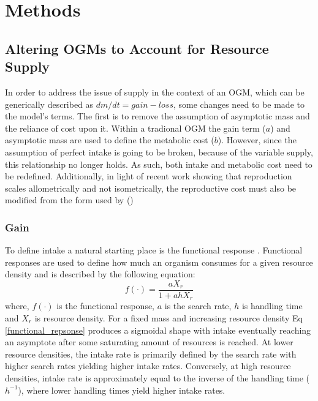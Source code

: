 \documentclass[a4paper, 11pt, hidelinks]{article} %
\begin{document}
% 
	\nolinenumbers
	
\section{Methods}
	\linenumbers
	
	\subsection{Altering OGMs to Account for Resource Supply}
	In order to address the issue of supply in the context of an OGM, which can be generically described as $dm/dt = gain - loss$, some changes need to be made to the model's terms.  The first is to remove the assumption of asymptotic mass and the reliance of cost upon it.  Within a tradional OGM the gain term ($ a $) and asymptotic mass are used to define the metabolic cost ($ b $).  However, since the assumption of perfect intake is going to be broken, because of the variable supply, this relationship no longer holds.  As such, both intake and metabolic cost need to be redefined.  Additionally, in light of recent work showing that reproduction scales allometrically and not isometrically, the reproductive cost must also be modified from the form used by \citeauthor{Charnov2001} (\citeyear{Charnov2001}) \parencite{Marshall2019, Barneche2018} %
	
	
	\subsubsection{Gain}
	To define intake a natural starting place is the functional response \parencite{Holling1959}.  Functional responses  are used to define how much an organism consumes for a given resource density and is described by the following equation:	
	\begin{equation}
		\label{functional_repsonse}
		f(\cdot) = \frac{a X_r}{1 + a h X_r}
	\end{equation}
	where, $ f(\cdot) $ is the functional response, $ a $ is the search rate, $ h $ is handling time and $ X_r $ is resource density.  
	For a fixed mass and increasing resource density Eq \ref{functional_repsonse} produces a sigmoidal shape with intake eventually reaching an asymptote after some saturating amount of resources is reached.  At lower resource densities, the intake rate is primarily defined by the search rate with higher search rates yielding higher intake rates.  Conversely, at high resource densities, intake rate is approximately equal to the inverse of the handling time ($ h^{-1} $), where lower handling times yield higher intake rates.  
	
\end{document}
